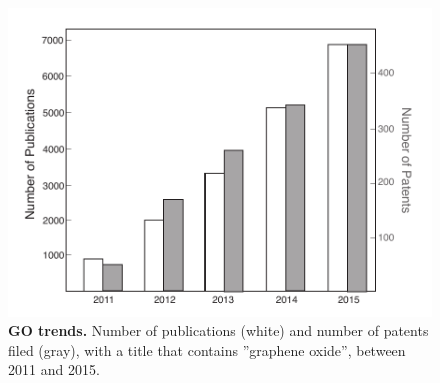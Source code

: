 \begin{figure}[h!]
  \centering
  \includegraphics[width=5in]{paper3/Fig1.pdf}
  \caption{\textbf{GO trends.} Number of publications (white) and number of patents filed (gray), with a title that contains ''graphene oxide'', between 2011 and 2015.}
  \label{Fig1_pap3}
\end{figure}

